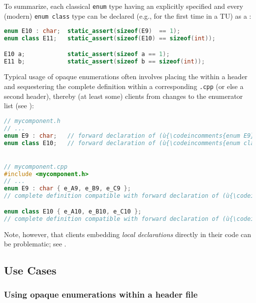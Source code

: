 \noindent To summarize, each classical \lstinline!enum! type having an explicitly
specified  and every (modern)
\lstinline!enum!~\lstinline!class! type can be declared (e.g., for the first
time in a TU) as a :

\begin{lstlisting}[language=C++]
enum E10 : char;  static_assert(sizeof(E9)  == 1);
enum class E11;   static_assert(sizeof(E10) == sizeof(int));

E10 a;            static_assert(sizeof a == 1);
E11 b;            static_assert(sizeof b == sizeof(int));
\end{lstlisting}

\noindent Typical usage of opaque enumerations often involves placing the
 within a header and sequestering the
complete definition within a corresponding \lstinline!.cpp! (or else a
second header), thereby  (at least some) clients from
changes to the enumerator list (see ):

\begin{lstlisting}[language=C++]
// mycomponent.h
// ...
enum E9 : char;   // forward declaration of (ù{\codeincomments{enum E9}}ù)
enum class E10;   // forward declaration of (ù{\codeincomments{enum class E10}}ù)


// mycomponent.cpp
#include <mycomponent.h>
// ...
enum E9 : char { e_A9, e_B9, e_C9 };
// complete definition compatible with forward declaration of (ù{\codeincomments{E9}}ù)

enum class E10 { e_A10, e_B10, e_C10 };
// complete definition compatible with forward declaration of (ù{\codeincomments{E10}}ù)
\end{lstlisting}

\noindent Note, however, that clients embedding \emph{local declarations} directly
in their code can be problematic; see .

\subsection[Use Cases]{Use Cases}\label{use-cases-opaqueenum}

\subsubsection[Using opaque enumerations within a header file]{Using opaque enumerations within a header file}\label{using-opaque-enumerations-within-a-header-file}

